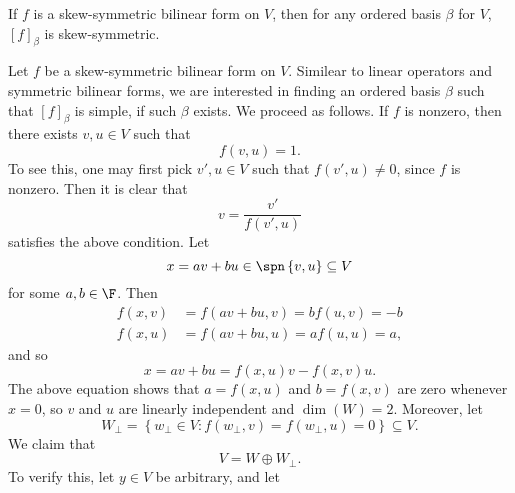 \documentclass[linearalgebra]{subfiles}
\begin{document}
    \begin{remark}
        If $f$ is a skew-symmetric bilinear form on $V$, then for any ordered basis $\beta$ for $V$, $\left[ f \right] _\beta$ is skew-symmetric.
    \end{remark}

    \begin{remark}
        Let $f$ be a skew-symmetric bilinear form on $V$. Similear to linear operators and symmetric bilinear forms, we are interested in finding an ordered basis $\beta$ such that $\left[ f \right] _\beta$ is simple, if such $\beta$ exists. We proceed as follows. If $f$ is nonzero, then there exists $v, u\in V$ such that
        \begin{equation*}
            f(v,u) = 1.
        \end{equation*}
        To see this, one may first pick $v',u\in V$ such that $f\left( v',u \right)\neq 0$, since $f$ is nonzero. Then it is clear that
        \begin{equation*}
            v = \frac{v'}{f\left( v',u \right) } 
        \end{equation*}
        satisfies the above condition. Let
        \begin{equation*}
            x = av + bu\in \spn\left\lbrace v,u \right\rbrace \subseteq V
        \end{equation*}
        for some $a,b\in\F$. Then
        \begin{align*}
            f\left( x,v \right) & = f\left( av+bu, v \right) = bf(u,v) = -b \\
            f\left( x,u \right) & = f\left( av+bu, u \right) = af(u,u) = a,
        \end{align*} 
        and so
        \begin{equation*}
            x = av+bu = f\left( x,u \right) v - f\left( x,v \right) u.
        \end{equation*}
        The above equation shows that $a=f(x,u)$ and $b=f(x,v)$ are zero whenever $x=0$, so $v$ and $u$ are linearly independent and $\dim(W)=2$. Moreover, let
        \begin{equation*}
            W_\perp = \left\lbrace w_\perp\in V: f\left( w_\perp,v \right) = f\left( w_\perp, u \right) = 0 \right\rbrace \subseteq V.
        \end{equation*}
        We claim that
        \begin{equation*}
            V = W\oplus W_\perp.
        \end{equation*}
        To verify this, let $y\in V$ be arbitrary, and let

\end{remark}
\end{document}
